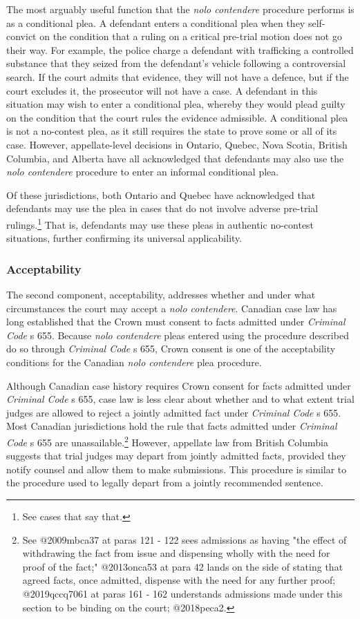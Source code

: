 The most arguably useful function that the \textit{nolo contendere} procedure performs is as a conditional plea. A defendant enters a conditional plea when they self-convict on the condition that a ruling on a critical pre-trial motion does not go their way. For example, the police charge a defendant with trafficking a controlled substance that they seized from the defendant's vehicle following a controversial search. If the court admits that evidence, they will not have a defence, but if the court excludes it, the prosecutor will not have a case. A defendant in this situation may wish to enter a conditional plea, whereby they would plead guilty on the condition that the court rules the evidence admissible. A conditional plea is not a no-contest plea, as it still requires the state to prove some or all of its case. However, appellate-level decisions in Ontario, Quebec, Nova Scotia, British Columbia, and Alberta have all acknowledged that defendants may also use the \textit{nolo contendere} procedure to enter an informal conditional plea. 

Of these jurisdictions, both Ontario and Quebec have acknowledged that defendants may use the plea in cases that do not involve adverse pre-trial rulings.\footnote{See cases that say that.} That is, defendants may use these pleas in authentic no-contest situations, further confirming its universal applicability.

\subsubsection{Acceptability}

The second component, acceptability, addresses whether and under what circumstances the court may accept a \textit{nolo contendere}. Canadian case law has long established that the Crown must consent to facts admitted under \textit{Criminal Code} s 655. Because \textit{nolo contendere} pleas entered using the procedure described do so through \textit{Criminal Code} s 655, Crown consent is one of the acceptability conditions for the Canadian \textit{nolo contendere} plea procedure.

Although Canadian case history requires Crown consent for facts admitted under \textit{Criminal Code} s 655, case law is less clear about whether and to what extent trial judges are allowed to reject a jointly admitted fact under \textit{Criminal Code} s 655. Most Canadian jurisdictions hold the rule that facts admitted under \textit{Criminal Code} s 655 are unassailable.\footnote{See @2009mbca37 at paras 121 - 122 sees admissions as having "the effect of withdrawing the fact from issue and dispensing wholly with the need for proof of the fact;" @2013onca53 at para 42 lands on the side of stating that agreed facts, once admitted, dispense with the need for any further proof; @2019qccq7061 at paras 161 - 162 understands admissions made under this section to be binding on the court; @2018peca2.} However, appellate law from British Columbia suggests that trial judges may depart from jointly admitted facts, provided they notify counsel and allow them to make submissions. This procedure is similar to the procedure used to legally depart from a jointly recommended sentence.

